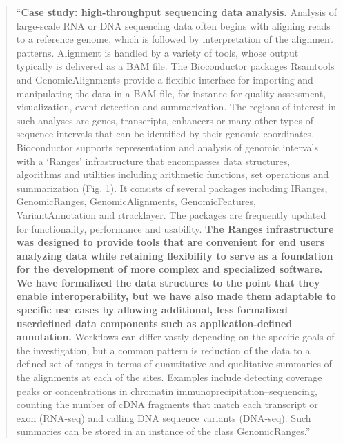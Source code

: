 \documentclass[]{tufte-book}
\begin{document}
\begin{quote}
``\textbf{Case study: high-throughput sequencing data analysis.} Analysis of
large-scale RNA or DNA sequencing data often begins with aligning reads to a
reference genome, which is followed by interpretation of the alignment patterns.
Alignment is handled by a variety of tools, whose output typically is delivered
as a BAM file. The Bioconductor packages Rsamtools and GenomicAlignments provide
a flexible interface for importing and manipulating the data in a BAM file, for
instance for quality assessment, visualization, event detection and
summarization. The regions of interest in such analyses are genes, transcripts,
enhancers or many other types of sequence intervals that can be identified by
their genomic coordinates. Bioconductor supports representation and analysis of
genomic intervals with a `Ranges' infrastructure that encompasses data
structures, algorithms and utilities including arithmetic functions, set
operations and summarization (Fig. 1). It consists of several packages
including IRanges, GenomicRanges, GenomicAlignments, GenomicFeatures,
VariantAnnotation and rtracklayer. The packages are frequently updated for
functionality, performance and usability. \textbf{The Ranges infrastructure was designed
to provide tools that are convenient for end users analyzing data while
retaining flexibility to serve as a foundation for the development of more
complex and specialized software. We have formalized the data structures to the
point that they enable interoperability, but we have also made them adaptable to
specific use cases by allowing additional, less formalized userdefined data
components such as application-defined annotation.} Workflows can differ vastly
depending on the specific goals of the investigation, but a common pattern is
reduction of the data to a defined set of ranges in terms of quantitative and
qualitative summaries of the alignments at each of the sites. Examples include
detecting coverage peaks or concentrations in chromatin
immunoprecipitation--sequencing, counting the number of cDNA fragments that match
each transcript or exon (RNA-seq) and calling DNA sequence variants (DNA-seq).
Such summaries can be stored in an instance of the class GenomicRanges.''
\citep{huber2015orchestrating}
\end{quote}
\end{document}
